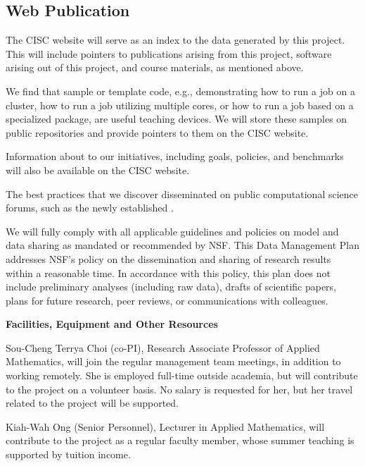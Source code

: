 \documentclass[11pt]{NSFamsart}
\begin{document}
\subsection*{Web Publication} The CISC website will serve as an index to the data generated by this project.  This will include pointers to publications arising from this project, software arising out of this project, and course materials, as mentioned above.  

We find that sample or template code, e.g., demonstrating how to run a job on a cluster, how to run a job utilizing multiple cores, or how to run a job based on a specialized package, are useful teaching devices.  We will store these samples on public repositories and provide pointers to them on the CISC website.

Information about to our initiatives, including goals, policies, and benchmarks will also be available on the CISC website.

The best practices that we discover disseminated on public computational science forums, such as the newly established \cite{BSS18}.


\bigskip
\noindent
We will fully comply with all applicable guidelines and policies on model and data sharing as mandated or recommended by NSF.
This Data Management Plan addresses NSF’s policy on the dissemination and sharing of research results within a reasonable time.  In accordance with this policy, this plan does not include preliminary analyses (including raw data), drafts of scientific papers, plans for future research, peer reviews, or communications with colleagues. 



\newpage \setcounter{page}{1} %


\centerline{\textbf{\Large Facilities, Equipment and Other Resources}}
\hypertarget{Facilities}{}

\bigskip

Sou-Cheng Terrya Choi (co-PI), Research Associate Professor of Applied Mathematics, will join the regular management team meetings, in addition to working remotely.  She is employed full-time outside academia, but will contribute to the project on a volunteer 
basis.  No salary is requested for her, but her travel related to the project will be supported.

Kiah-Wah Ong (Senior Personnel), Lecturer in Applied Mathematics, will contribute to the project as a regular faculty member, whose summer teaching is supported by tuition income.
\end{document}
